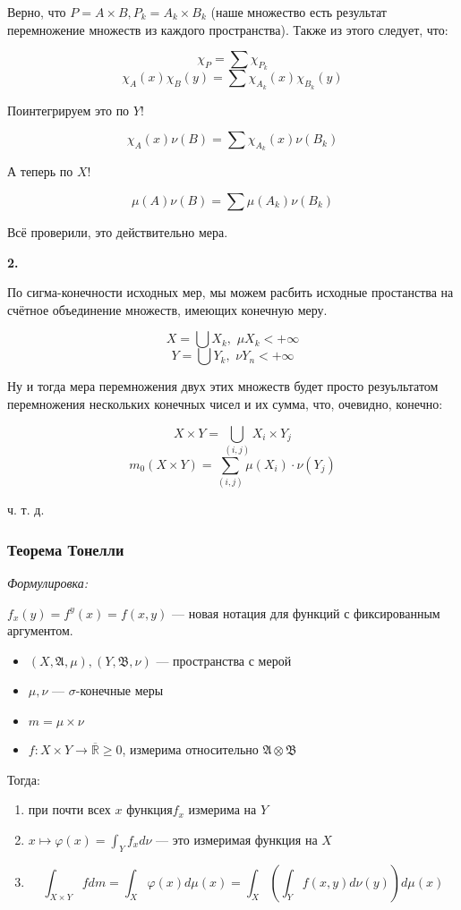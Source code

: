 \documentclass{article}
\def\dbl{\,\,}
\def\rinf{\overline{\mathbb{R}}}
\begin{document}
Верно, что $P = A \times B, P_k = A_k \times B_k$ (наше множество есть результат перемножение множеств из каждого пространства). Также из этого следует, что:

\[\chi_P = \sum \chi_{P_k}\]
\[\chi_A(x)\chi_B(y) = \sum \chi_{A_k}(x)\chi_{B_k}(y)\]

Поинтегрируем это по $Y$!

\[\chi_A(x) \nu(B) = \sum \chi_{A_k}(x)\nu(B_k)\]

А теперь по $X$!

\[\mu(A)\nu(B) = \sum \mu(A_k) \nu(B_k)\]

Всё проверили, это действительно мера.

\textbf{2.}

По сигма-конечности исходных мер, мы можем расбить исходные простанства на счётное объединение множеств, имеющих конечную меру.

\[X = \bigcup X_k, \dbl \mu X_k < +\infty\]
\[Y = \bigcup Y_k, \dbl \nu Y_n < +\infty\]

Ну и тогда мера перемножения двух этих множеств будет просто резуьльтатом перемножения нескольких конечных чисел и их сумма, что, очевидно, конечно:

\[X \times Y = \bigcup_{(i, j)} X_i \times Y_j\]
\[m_0(X \times Y) = \sum_{(i, j)} \mu(X_i) \cdot \nu(Y_j)\]

ч. т. д. 

\subsubsection{Теорема Тонелли}
\textit{Формулировка:}

$f_x(y) = f^y(x) = f(x, y)$ --- новая нотация для функций с фиксированным аргументом.

\begin{itemize}
    \item $(X, \mathfrak{A}, \mu), (Y, \mathfrak{B}, \nu)$ --- пространства с мерой
    \item $\mu, \nu$ --- $\sigma$-конечные меры
    \item $m = \mu \times \nu$
    \item $f: X \times Y \rightarrow \rinf \ge 0$, измерима относительно $\mathfrak{A} \otimes \mathfrak{B}$
\end{itemize}

Тогда:

\begin{enumerate}
    \item при почти всех $x$ функция$f_{x}$ измерима на $Y$
    \item $x \mapsto \varphi(x) = \int_{Y} f_{x} d\nu$ --- это измеримая функция на $X$
    \item \[\int_{X \times Y} f dm= \int_{X} \varphi(x) d \mu(x) = \int_{X} \left( \int_{Y} f(x, y) d  \nu (y)\right) d \mu(x)\]
\end{enumerate}
\end{document}
